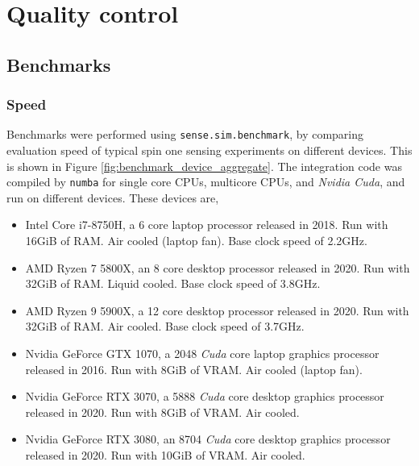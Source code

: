 \documentclass{jors}
\begin{document}
\section*{Quality control}
	\subsection*{Benchmarks}
		\subsubsection*{Speed}
			Benchmarks were performed using \texttt{sense.sim.benchmark}, by comparing evaluation speed of typical spin one sensing experiments on different devices. This is shown in Figure \ref{fig:benchmark_device_aggregate}. The integration code was compiled by \texttt{numba} for single core CPUs, multicore CPUs, and \emph{Nvidia Cuda}, and run on different devices. These devices are,
			\begin{itemize}
				\item {} 
				Intel Core i7-8750H, a 6 core laptop processor released in 2018. Run with 16GiB of RAM. Air cooled (laptop fan). Base clock speed of 2.2GHz.

				\item {} 
				AMD Ryzen 7 5800X, an 8 core desktop processor released in 2020. Run with 32GiB of RAM. Liquid cooled. Base clock speed of 3.8GHz.

				\item {} 
				AMD Ryzen 9 5900X, a 12 core desktop processor released in 2020. Run with 32GiB of RAM. Air cooled. Base clock speed of 3.7GHz.

				\item {} 
				Nvidia GeForce GTX 1070, a 2048 \emph{Cuda} core laptop graphics processor released in 2016. Run with 8GiB of VRAM. Air cooled (laptop fan).

				\item {} 
				Nvidia GeForce RTX 3070, a 5888 \emph{Cuda} core desktop graphics processor released in 2020. Run with 8GiB of VRAM. Air cooled.

				\item {} 
				Nvidia GeForce RTX 3080, an 8704 \emph{Cuda} core desktop graphics processor released in 2020. Run with 10GiB of VRAM. Air cooled.
			\end{itemize}
\end{document}
